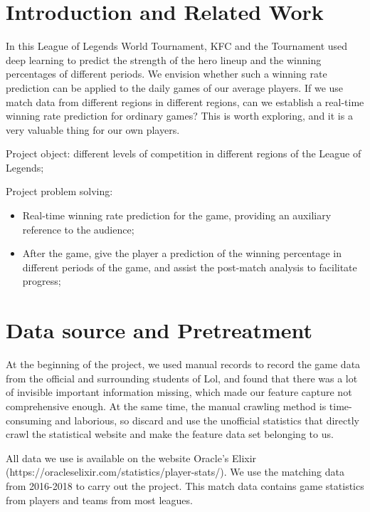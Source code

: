 \documentclass[fleqn,10pt]{wlscirep}
\begin{document}
\section*{Introduction and Related Work}

In this League of Legends World Tournament, KFC and the Tournament used deep learning to predict the strength of the hero lineup and the winning percentages of different periods. We envision whether such a winning rate prediction can be applied to the daily games of our average players. If we use match data from different regions in different regions, can we establish a real-time winning rate prediction for ordinary games? This is worth exploring, and it is a very valuable thing for our own players.

Project object: different levels of competition in different regions of the League of Legends;

Project problem solving:

\begin{itemize}
\item Real-time winning rate prediction for the game, providing an auxiliary reference to the audience;
\item After the game, give the player a prediction of the winning percentage in different periods of the game, and assist the post-match analysis to facilitate progress;
\end{itemize}



\section*{Data source and Pretreatment}

 At the beginning of the project, we used manual records to record the game data from the official and surrounding students of Lol, and found that there was a lot of invisible important information missing, which made our feature capture not comprehensive enough. At the same time, the manual crawling method is time-consuming and laborious, so discard and use the unofficial statistics that directly crawl the statistical website and make the feature data set belonging to us.

All data we use is available on the website Oracle's Elixir (https://oracleselixir.com/statistics/player-stats/). We use the matching data from 2016-2018 to carry out the project. This match data contains game statistics from players and teams from most leagues.
\end{document}
